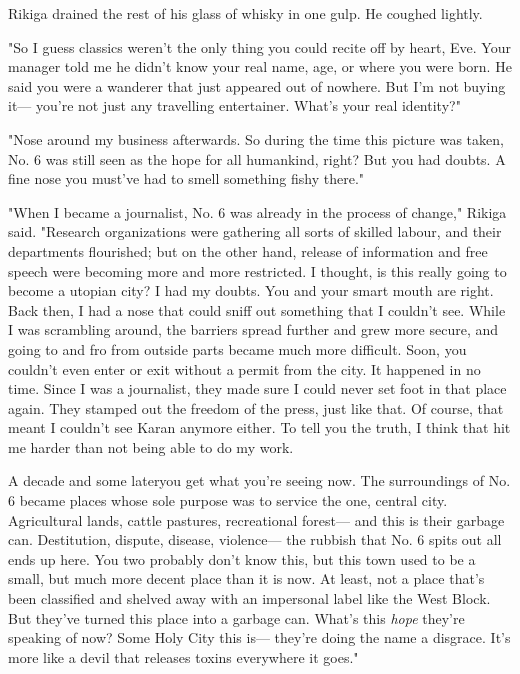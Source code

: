 Rikiga drained the rest of his glass of whisky in one gulp. He coughed
lightly.

"So I guess classics weren't the only thing you could recite off by
heart, Eve. Your manager told me he didn't know your real name, age, or
where you were born. He said you were a wanderer that just appeared out
of nowhere. But I'm not buying it--- you're not just any travelling
entertainer. What's your real identity?"

"Nose around my business afterwards. So during the time this picture was
taken, No. 6 was still seen as the hope for all humankind, right? But
you had doubts. A fine nose you must've had to smell something fishy
there."

"When I became a journalist, No. 6 was already in the process of
change," Rikiga said. "Research organizations were gathering all sorts
of skilled labour, and their departments flourished; but on the other
hand, release of information and free speech were becoming more and more
restricted. I thought, is this really going to become a utopian city? I
had my doubts. You and your smart mouth are right. Back then, I had a
nose that could sniff out something that I couldn't see. While I was
scrambling around, the barriers spread further and grew more secure, and
going to and fro from outside parts became much more difficult. Soon,
you couldn't even enter or exit without a permit from the city. It
happened in no time. Since I was a journalist, they made sure I could
never set foot in that place again. They stamped out the freedom of the
press, just like that. Of course, that meant I couldn't see Karan
anymore either. To tell you the truth, I think that hit me harder than
not being able to do my work.

A decade and some later\el you get what you're seeing now. The
surroundings of No. 6 became places whose sole purpose was to service
the one, central city. Agricultural lands, cattle pastures, recreational
forest--- and this is their garbage can. Destitution, dispute, disease,
violence--- the rubbish that No. 6 spits out all ends up here. You two
probably don't know this, but this town used to be a small, but much
more decent place than it is now. At least, not a place that's been
classified and shelved away with an impersonal label like the West
Block. But they've turned this place into a garbage can. What's this
\emph{hope} they're speaking of now? Some Holy City this is--- they're doing the
name a disgrace. It's more like a devil that releases toxins everywhere
it goes."

